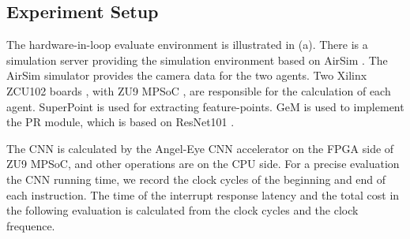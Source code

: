 \label{sec:experiments}







\subsection{ Experiment Setup }

The hardware-in-loop evaluate environment is illustrated in (a). There is a simulation server providing the simulation environment based on AirSim \cite{shah2018airsim}. The AirSim simulator provides the camera data for the two agents. Two Xilinx ZCU102 boards \cite{zcu102}, with ZU9 MPSoC \cite{MPSoC}, are responsible for the calculation of each agent.
SuperPoint \cite{detone2018superpoint} is used for extracting feature-points. GeM \cite{radenovic2018fine} is used to implement the PR module, which is based on ResNet101 \cite{he2016deep}. 

The CNN is calculated by the Angel-Eye CNN accelerator \cite{guo2017angel} on the FPGA side of ZU9 MPSoC, and other operations are on the CPU side.
For a precise evaluation the CNN running time, we record the clock cycles of the beginning and end of each instruction. The time of the interrupt response latency and the total cost in the following evaluation is calculated from the clock cycles and the clock frequence.


 
